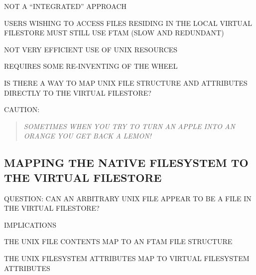 \begin{bwslide}

\begin{nrtc}
\item	NOT A ``INTEGRATED'' APPROACH
    \begin{nrtc}
    \item	USERS WISHING TO ACCESS FILES RESIDING IN THE LOCAL VIRTUAL
		FILESTORE MUST STILL USE FTAM (SLOW AND REDUNDANT)
    \end{nrtc}

\item	NOT VERY EFFICIENT USE OF UNIX RESOURCES

\item	REQUIRES SOME RE-INVENTING OF THE WHEEL
\end{nrtc}
\end{bwslide}


\begin{bwslide}

\begin{nrtc}
\item	IS THERE A WAY TO MAP UNIX FILE STRUCTURE AND ATTRIBUTES DIRECTLY
	TO THE VIRTUAL FILESTORE?

\item	CAUTION:
    \begin{quote}\em
	SOMETIMES WHEN YOU TRY TO TURN AN APPLE INTO AN ORANGE YOU GET BACK A
	LEMON!    
    \end{quote}
\end{nrtc}
\end{bwslide}


\begin{bwslide}
\part*	{MAPPING THE NATIVE FILESYSTEM TO THE VIRTUAL FILESTORE}\bf

\begin{nrtc}
\item	QUESTION: CAN AN ARBITRARY UNIX FILE APPEAR TO BE A FILE IN
	THE VIRTUAL FILESTORE?

\item	IMPLICATIONS
    \begin{nrtc}
    \item	THE UNIX FILE CONTENTS MAP TO AN FTAM FILE STRUCTURE

    \item	THE UNIX FILESYSTEM ATTRIBUTES MAP TO VIRTUAL FILESYSTEM
		ATTRIBUTES
    \end{nrtc}
\end{nrtc}
\end{bwslide}


